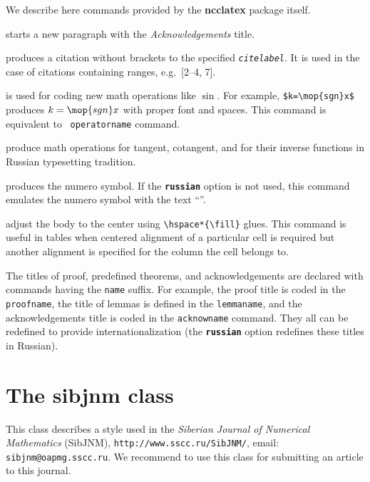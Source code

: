 \documentclass[11pt]{ncc}
\newcommand*\package[1]{\textbf{#1}}
\newcommand*\Opt[1]{\texttt{\textbf{#1}}}
\newcommand*\Meta[1]{\texttt{\upshape#1}}
\newcommand*\com[1]{\Meta{\symbol{"5C}#1}}
\newcommand*\meta[1]{\Meta{\symbol{"7B}{\itshape #1}\symbol{"7D}}}
\begin{document}
We describe here commands provided by the \package{ncclatex}
package itself.
\begin{desclist}{}{}
\item[\com{acknow}] starts a new paragraph with the
\textit{Acknowledgements} title.

\item[\com{cref}\meta{citelabel}] produces a citation without brackets to the
specified \Meta{\itshape citelabel}. It is used in the case of
citations containing ranges, e.g.\ [2--4, 7].

\item[\com{mop}\meta{name}] is used for coding new math operations
like $\sin$. For example, \verb+$k=\mop{sgn}x$+ produces
$k=\mop{sgn}x$ with proper font and spaces. This command is
equivalent to \AmS\ \com{operatorname} command.

\item[\com{tg}, \com{ctg}, \com{arctg}, and \com{arcctg}] produce
math operations for tangent, cotangent, and for their inverse
functions in Russian typesetting tradition.

\item[\com{No}] produces the numero symbol. If the \Opt{russian}
option is not used, this command emulates the numero symbol with
the text ``\No''.

\item[\com{tc}\meta{body}] adjust the body to the center
using \verb+\hspace*{\fill}+ glues. This
command is useful in tables when centered alignment of a
particular cell is required but another alignment is
specified for the column the cell belongs to.

\end{desclist}

The titles of proof, predefined theorems, and acknowledgements
are declared with commands having the \Meta{name} suffix. For
example, the proof title is coded in the \com{proofname}, the
title of lemmas is defined in the \com{lemmaname}, and the
acknowledgements title is coded in the \com{acknowname} command.
They all can be redefined to provide internationalization (the
\Opt{russian} option redefines these titles in Russian).

\section{The sibjnm class}

This class describes a style used in the \textit{Siberian Journal
of Numerical Mathematics} (SibJNM),
\texttt{http://www.sscc.ru/SibJNM/}, email:
\texttt{sibjnm@oapmg.sscc.ru}. We recommend to use this class for
submitting an article to this journal.
\end{document}
